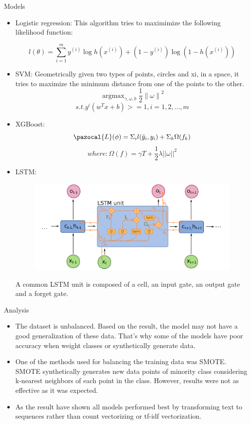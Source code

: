\documentclass[final]{beamer}
\newlength{\onecolwid}
\DeclareMathOperator*{\argmax}{argmax}
\newcommand{\Lb}{\pazocal{L}}
\begin{document}
\begin{frame}[t]
\begin{columns}[t]
\begin{column}{\onecolwid}
\begin{block}{Models}
\begin{itemize}
\item Logistic regression:
This algorithm tries to maximimize the following likelihood function:

\[l(\theta)= \sum_{i=1}^{m}y^{(i)}\log h(x^{(i)})+(1-y^{(i)})\log (1-h(x^{(i)}))\]
\item SVM: 
Geometrically given two types of points, circles and xi, in a space, it tries to maximize the minimum distance from one of the points to the other.
\[\argmax_{\gamma,\omega,b}\frac{1}{2}\left\|\omega\right\|^2\]
\[s.t. y^{i}(w^{T}x+b)>=1,i=1,2,...,m\]


\item XGBoost: 
\[\Lb (\phi) = \Sigma_i l(\hat{y}_i, y_i) + \Sigma_k \Omega (f_k) \]
\[where: \Omega (f) = \gamma T + \frac{1}{2}\lambda ||\omega||^2\]

\item LSTM:

\begin{figure}
	\includegraphics[width=0.3\linewidth, height=0.35\textheight, keepaspectratio]{figure2.png}
	\label{fig:feature_imp}

\end{figure}


A common LSTM unit is composed of a cell, an input gate, an
output gate and a forget gate.

\end{itemize}
\end{block}

\begin{block}{Analysis}

\begin{itemize}
\item The dataset is unbalanced. Based on the result, the model may not have a good generalization of these data. That’s why some of the models have poor accuracy when weight classes or synthetically generate data.
\item One of the methods used for balancing the training data was SMOTE. SMOTE synthetically generates new data points of minority class considering k-nearest neighbors of each point in the class. However, results were not as effective as it was expected. 
\item As the result have shown all models performed best by transforming text to sequences rather than count vectorizing or tf-idf vectorization. 
\end{itemize}



\end{block}
\end{column}
\end{columns}
\end{frame}
\end{document}
